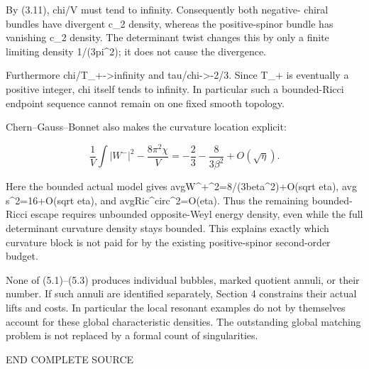 \documentclass[
  10pt,
]{article}
\begin{document}
By (3.11), chi/V must tend to infinity. Consequently both negative-
chiral bundles have divergent c\_2 density, whereas the positive-spinor
bundle has vanishing c\_2 density. The determinant twist changes this by
only a finite limiting density 1/(3pi\^{}2); it does not cause the
divergence.

Furthermore chi/T\_+-\textgreater infinity and tau/chi-\textgreater-2/3.
Since T\_+ is eventually a positive integer, chi itself tends to
infinity. In particular such a bounded-Ricci endpoint sequence cannot
remain on one fixed smooth topology.

Chern--Gauss--Bonnet also makes the curvature location explicit:

\[
 \frac1V\int|W^-|^2-\frac{8\pi^2\chi}{V}
                  =-\frac23-\frac8{3\beta^2}+O(\sqrt\eta).      \tag{5.3}
\]

Here the bounded actual model gives
avg\textbar W\^{}+\textbar\^{}2=8/(3beta\^{}2)+O(sqrt eta), avg
s\^{}2=16+O(sqrt eta), and avg\textbar Ric\^{}circ\textbar\^{}2=O(eta).
Thus the remaining bounded-Ricci escape requires unbounded opposite-Weyl
energy density, even while the full determinant curvature density stays
bounded. This explains exactly which curvature block is not paid for by
the existing positive-spinor second-order budget.

None of (5.1)--(5.3) produces individual bubbles, marked quotient
annuli, or their number. If such annuli are identified separately,
Section 4 constrains their actual lifts and costs. In particular the
local resonant examples do not by themselves account for these global
characteristic densities. The outstanding global matching problem is not
replaced by a formal count of singularities.

END COMPLETE SOURCE
\end{document}
